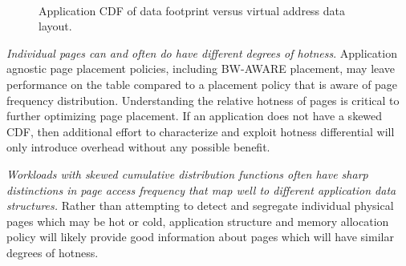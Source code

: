 \begin{figure}[]
    \\
    \caption{Application CDF of data footprint versus virtual address data layout.}
    \label{fig:cdfannotation}
\end{figure}

\emph{Individual pages can and often do have different degrees of hotness}.
Application agnostic page placement policies, including BW-AWARE placement, may leave performance 
on the table compared to a placement policy that is aware of page frequency distribution. 
Understanding the relative hotness of pages
is critical to further optimizing page placement.  If an application does not have a skewed CDF, 
then additional effort to characterize and exploit hotness differential will only introduce 
overhead without any possible benefit.

\emph{Workloads with skewed cumulative distribution functions often have sharp
distinctions in page access frequency that map well to different application 
data structures.}  Rather than attempting to detect and segregate individual physical pages 
which may be hot or cold, application structure and memory allocation policy
will likely provide good information about pages which will have similar degrees of hotness.

